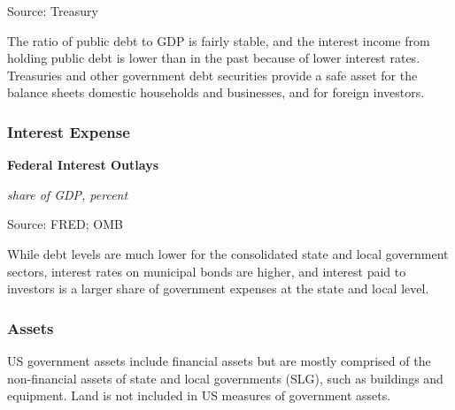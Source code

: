 \documentclass{report}
\makeatletter
\newcommand{\tbllink}[1]{\href{https://raw.githubusercontent.com/bdecon/US-chartbook/master/chartbook/data/#1}{\faTable}}
\newcommand*\short[1]{\expandafter\@gobbletwo\number\numexpr#1\relax}
\newcommand{\shdateaxisticks}{
		date coordinates in=x, axis line style={draw=none},
		xmax={2020-11-15},
		max space between ticks=40,	    
		xtick={{1990-01-01}, {1995-01-01}, {2000-01-01}, 
			{2005-01-01}, {2010-01-01}, {2015-01-01}, {2020-01-01}},
		minor xtick={},
		enlarge y limits={0.06}, enlarge x limits={0.01},
		}
\newcommand{\thickline}[4]{\addplot[ultra thick, no markers, color=#1] 
		table [x=#2, y=#3, col sep=comma] {#4};	}
\newcommand{\rbars}{
		\fill[color=black!10] (axis cs:{1990-07-01},\pgfkeysvalueof{/pgfplots/ymin}) rectangle 
			(axis cs:{1991-03-01}, \pgfkeysvalueof{/pgfplots/ymax});
		\fill[color=black!10] (axis cs:{2007-12-01},\pgfkeysvalueof{/pgfplots/ymin}) rectangle 
			(axis cs:{2009-07-01}, \pgfkeysvalueof{/pgfplots/ymax});
		\fill[color=black!10] (axis cs:{2001-03-01},\pgfkeysvalueof{/pgfplots/ymin}) rectangle 
			(axis cs:{2001-11-01}, \pgfkeysvalueof{/pgfplots/ymax});
		\fill[color=black!10] (axis cs:{2020-02-01},\pgfkeysvalueof{/pgfplots/ymin}) rectangle 
			(axis cs:{2020-10-01}, \pgfkeysvalueof{/pgfplots/ymax});}
\makeatother
\begin{document}
{{{{{\begin{minipage}{0.76\textwidth}
\footnotesize{Source: Treasury} \hfill \tbllink{pubdebt.csv}

\vspace{4mm}

\small The ratio of public debt to GDP is fairly stable, and the interest income from holding public debt is lower than in the past because of lower interest rates. Treasuries and other government debt securities provide a safe asset for the balance sheets domestic households and businesses, and for foreign investors.

\end{minipage}

\subsubsection*{\color{black!70} \seriffont Interest Expense}

\begin{minipage}{0.33\textwidth}
\small 
\end{minipage} \hspace{7mm} \begin{minipage}{0.37\textwidth}
\normalsize \textbf{Federal Interest Outlays}

\footnotesize{\textit{share of GDP, percent}}

\hspace*{-2mm} 

\footnotesize{Source: FRED; OMB} \hfill \tbllink{fedintexp.csv}

\end{minipage} 

\vspace{2mm}

\begin{minipage}{0.76\textwidth}
\small While debt levels are much lower for the consolidated state and local government sectors, interest rates on municipal bonds are higher, and interest paid to investors is a larger share of government expenses at the state and local level.
\end{minipage}
\newpage
\subsubsection*{\color{black!70} \seriffont Assets}
\begin{minipage}{0.76\textwidth}
\small US government assets include financial assets but are mostly comprised of the non-financial assets of state and local governments (SLG), such as buildings and equipment. Land is not included in US measures of government assets. \\


\end{minipage}}}}}}
\end{document}
